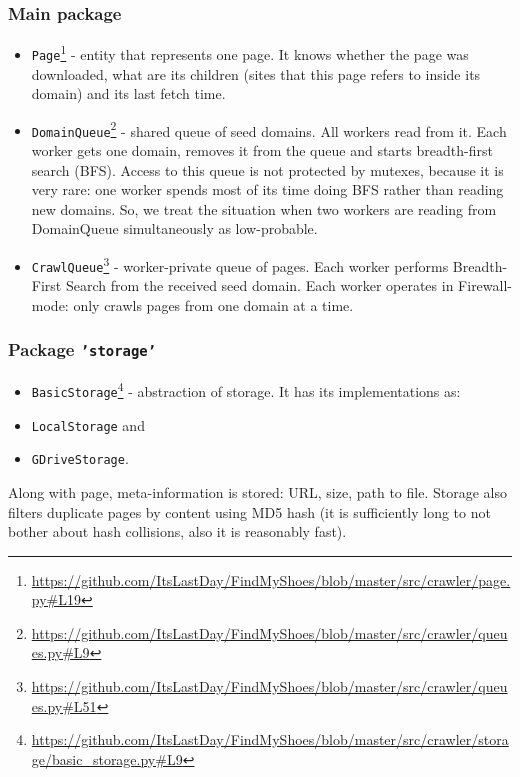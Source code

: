 \documentclass[format=sigconf]{acmart}
\begin{document}
    \subsubsection{Main package}

    \begin{itemize}
    \item \texttt{Page}\footnote{\url{https://github.com/ItsLastDay/FindMyShoes/blob/master/src/crawler/page.py\#L19}} - entity that represents one page. It knows whether the page was downloaded, what are its children (sites that this page refers to inside its domain) and its last fetch time.
    
    \item \texttt{DomainQueue}\footnote{\url{https://github.com/ItsLastDay/FindMyShoes/blob/master/src/crawler/queues.py\#L9}} - shared queue of seed domains. All workers read from it. Each worker gets one domain, removes it from the queue and starts breadth-first search (BFS). 
    Access to this queue is not protected by mutexes, because it is very rare: one worker spends most of its time doing BFS rather than reading new domains. So, we treat the situation when two workers are reading from DomainQueue simultaneously as low-probable.
    
    \item \texttt{CrawlQueue}\footnote{\url{https://github.com/ItsLastDay/FindMyShoes/blob/master/src/crawler/queues.py\#L51}} - worker-private queue of pages. Each worker performs Breadth-First Search from the received seed domain. Each worker operates in Firewall-mode: only crawls pages from one domain at a time.
    \end{itemize}
    
    \subsubsection{Package \texttt{'storage'}}
    \begin{itemize}
    \item \texttt{BasicStorage}\footnote{\url{https://github.com/ItsLastDay/FindMyShoes/blob/master/src/crawler/storage/basic_storage.py\#L9}} - abstraction of storage. It has its implementations as:
    \item \texttt{LocalStorage} and
    \item \texttt{GDriveStorage}.
    \end{itemize}
    
    Along with page, meta-information is stored: URL, size, path to file. Storage also filters duplicate pages by content using MD5 hash (it is sufficiently long to not bother about hash collisions, also it is reasonably fast).
    
\end{document}
